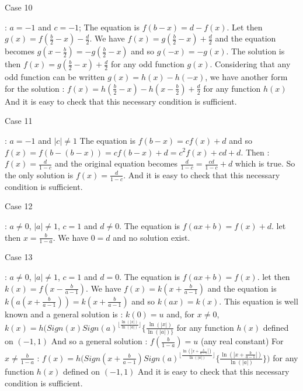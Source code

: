 \begin{mysolution}
\begin{underlined}Case 10\end{underlined}: $ a = - 1$ and $ c = - 1$; The equation is $ f(b - x) = d - f(x)$. Let then $ g(x) = f(\frac {b}{2} - x) - \frac {d}{2}$. We have $ f(x) = g(\frac {b}{2} - x) + \frac {d}{2}$ and the equation becomes $ g(x - \frac {b}{2}) = - g(\frac {b}{2} - x)$ and so $ g( - x) = - g(x)$. 
The solution is then $ f(x) = g(\frac {b}{2} - x) + \frac {d}{2}$ for any odd function $ g(x)$.
Considering that any odd function can be written $ g(x) = h(x) - h( - x)$, we have another form for the solution :
$ f(x) = h(\frac {b}{2} - x) - h(x - \frac {b}{2}) + \frac {d}{2}$  for any function $ h(x)$
And it is easy to check that this necessary condition is sufficient.


\begin{underlined}Case 11\end{underlined}: $ a = - 1$ and $ |c|\neq 1$ The equation is $ f(b - x) = cf(x) + d$ and so $ f(x) = f(b - (b - x)) = cf(b - x) + d = c^2f(x) + cd + d$. Then :
$ f(x) = \frac {d}{1 - c}$ and the original equation becomes $ \frac {d}{1 - c} = \frac {cd}{1 - c} + d$ which is true.
So the only solution is $ f(x) = \frac {d}{1 - c}$.
And it is easy to check that this necessary condition is sufficient.

\begin{underlined}Case 12\end{underlined}: $ a\neq 0$, $ |a|\neq 1$, $ c = 1$ and $ d\neq 0$. The equation is $ f(ax + b) = f(x) + d$. let then $ x = \frac {b}{1 - a}$. We have $ 0 = d$ and no solution exist.

\begin{underlined}Case 13\end{underlined}: $ a\neq 0$, $ |a|\neq 1$, $ c = 1$ and $ d = 0$. The equation is $ f(ax + b) = f(x)$. let then $ k(x) = f(x - \frac {b}{a - 1})$. We have $ f(x) = k(x + \frac {b}{a - 1})$ and the equation is $ k(a(x + \frac {b}{a - 1})) = k(x + \frac {b}{a - 1})$ and so $ k(ax) = k(x)$.
This equation is well known and a general solution is :
$ k(0) = u$ and, for $ x\neq 0$, $ k(x) = h(Sign(x)Sign(a)^{\lfloor\frac {\ln(|x|)}{\ln(|a|)}\rfloor}{\{\frac {\ln(|x|)}{\ln(|a|)\}}}$ for any function $ h(x)$ defined on $ ( - 1,1)$
And so a general solution :
$ f(\frac {b}{1 - a}) = u$ (any real constant)
For $ x\neq\frac {b}{1 - a}$ : $ f(x) = h(Sign(x + \frac {b}{a - 1})Sign(a)^{\lfloor\frac {\ln(|x + \frac {b}{a - 1}|)}{\ln(|a|)}\rfloor}{\{\frac {\ln(|x + \frac {b}{a - 1}|)}{\ln(|a|)}\})}$ for any function $ h(x)$ defined on $ ( - 1,1)$
And it is easy to check that this necessary condition is sufficient.


\end{mysolution}
